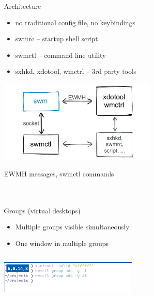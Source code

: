 \documentclass[aspectratio=43]{beamer}
\newcommand{\codeblock}[2]{
    \begin{center}
        \begin{minipage}{0.8\linewidth}
            \inputminted{#1}{#2}
        \end{minipage}
    \end{center}
}
\begin{document}
    \begin{frame}{Architecture}
        \begin{itemize}
            \item no traditional config file, no keybindings
            \item swmrc -- startup shell script
            \item swmctl -- command line utility
            \item sxhkd, xdotool, wmctrl -- 3rd party tools
        \end{itemize}
        \begin{center}
            \includegraphics[width=8cm]{img/arch.pdf}
        \end{center}
    \end{frame}

    \begin{frame}{EWMH messages, swmctl commands}
        \codeblock{bash}{listings/xdotool.txt}
        \codeblock{bash}{listings/swmctl.txt}
        \codeblock{bash}{listings/swmctl2.txt}
    \end{frame}

    \begin{frame}[fragile]{Groups \small{(virtual desktops)}}
        \begin{itemize}
            \item Multiple groups visible simultaneously
            \item One window in multiple groups
        \end{itemize}
        \codeblock{bash}{listings/groups.txt}
        \begin{center}
            \includegraphics[width=7cm]{../img/group_info.png}
        \end{center}
    \end{frame}
\end{document}
